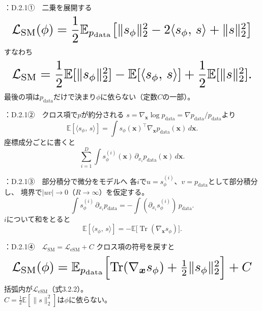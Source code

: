 \assuppl
\begin{frame}{\supplmark：D.2.1①　二乗を展開する}
    \[
        \resizebox{0.98\textwidth}{!}{$
        \mathcal{L}_{\mathrm{SM}}(\phi)
        =
        \dfrac12
        \mathbb{E}_{p_{\mathrm{data}}}
        \bigl[
        \|s_\phi\|_2^2
        -
        2\langle s_\phi,\,s\rangle
        +
        \|s\|_2^2
        \bigr]
        $}
    \]
    すなわち
    \[
        \resizebox{0.98\textwidth}{!}{$
        \mathcal{L}_{\mathrm{SM}}
        =
        \dfrac12\mathbb{E}[\|s_\phi\|_2^2]
        -
        \mathbb{E}[\langle s_\phi,\,s\rangle]
        +
        \dfrac12\mathbb{E}[\|s\|_2^2].
        $}
    \]
    最後の項は$p_{\mathrm{data}}$だけで決まり$\phi$に依らない（定数$C$の一部）。
\end{frame}
\assuppl
\begin{frame}{\supplmark：D.2.1②　クロス項で$p$が約分される}
    $s=\nabla_{\bm{x}}\log p_{\mathrm{data}}=\nabla p_{\mathrm{data}}/p_{\mathrm{data}}$より
    \[
        \mathbb{E}[\langle s_\phi,\,s\rangle]
        =
        \int s_\phi(\bm{x})^{\top}
        \nabla_{\bm{x}}p_{\mathrm{data}}(\bm{x})\,d\bm{x}.
    \]
    座標成分ごとに書くと
    \[
        \sum_{i=1}^{D}
        \int
        s_\phi^{(i)}(\bm{x})\,
        \partial_{x_i}p_{\mathrm{data}}(\bm{x})\,
        d\bm{x}.
    \]
\end{frame}
\assuppl
\begin{frame}{\supplmark：D.2.1③　部分積分で微分をモデルへ}
    各$i$で$u=s_\phi^{(i)}$、$v=p_{\mathrm{data}}$として部分積分し、
    境界で$|uv|\to0$（$R\to\infty$）を仮定する。
    \[
        \int s_\phi^{(i)}\,\partial_{x_i}p_{\mathrm{data}}
        =
        -
        \int
        (\partial_{x_i}s_\phi^{(i)})\,
        p_{\mathrm{data}}.
    \]
    $i$について和をとると
    \[
        \mathbb{E}[\langle s_\phi,\,s\rangle]
        =
        -
        \mathbb{E}\bigl[
        \operatorname{Tr}(\nabla_{\bm{x}}s_\phi)
        \bigr].
    \]
\end{frame}
\assuppl
\begin{frame}{\supplmark：D.2.1④　$\mathcal{L}_{\mathrm{SM}}=\mathcal{L}_{\mathrm{eSM}}+C$}
    クロス項の符号を戻すと
    \[
        \resizebox{0.98\textwidth}{!}{$
        \mathcal{L}_{\mathrm{SM}}(\phi)
        =
        \mathbb{E}_{p_{\mathrm{data}}}
        \Bigl[
        \operatorname{Tr}(\nabla_{\bm{x}}s_\phi)
        +
        \tfrac12\|s_\phi\|_2^2
        \Bigr]
        +
        C
        $}
    \]
    括弧内が$\mathcal{L}_{\mathrm{eSM}}$（式3.2.2）。\\
    $C=\tfrac12\mathbb{E}[\|s\|_2^2]$は$\phi$に依らない。
\end{frame}
